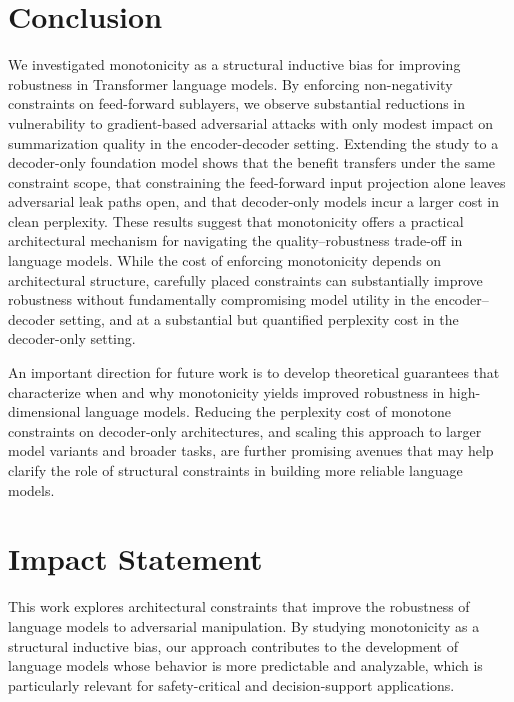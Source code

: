 \documentclass{article}
\theoremstyle{plain}
\theoremstyle{definition}
\theoremstyle{remark}
\begin{document}
\section{Conclusion}

We investigated monotonicity as a structural inductive bias for improving robustness in Transformer language models. By enforcing non-negativity constraints on feed-forward sublayers, we observe substantial reductions in vulnerability to gradient-based adversarial attacks with only modest impact on summarization quality in the encoder-decoder setting. Extending the study to a decoder-only foundation model shows that the benefit transfers under the same constraint scope, that constraining the feed-forward input projection alone leaves adversarial leak paths open, and that decoder-only models incur a larger cost in clean perplexity.
These results suggest that monotonicity offers a practical
architectural mechanism for navigating the
quality--robustness trade-off in language models. While the
cost of enforcing monotonicity depends on architectural
structure, carefully placed constraints can substantially
improve robustness without fundamentally compromising model
utility in the encoder--decoder setting, and at a substantial but quantified perplexity cost in the decoder-only setting.


An important direction for future work is to develop theoretical guarantees that characterize when and why monotonicity yields improved robustness in high-dimensional language models. Reducing the perplexity cost of monotone constraints on decoder-only architectures, and scaling this approach to larger model variants and broader tasks, are further promising avenues that may help clarify the role of structural constraints in building more reliable language models.
\section*{Impact Statement}

This work explores architectural constraints that improve the robustness of language models to adversarial manipulation. By studying monotonicity as a structural inductive bias, our approach contributes to the development of language models whose behavior is more predictable and analyzable, which is particularly relevant for safety-critical and decision-support applications.
\end{document}
